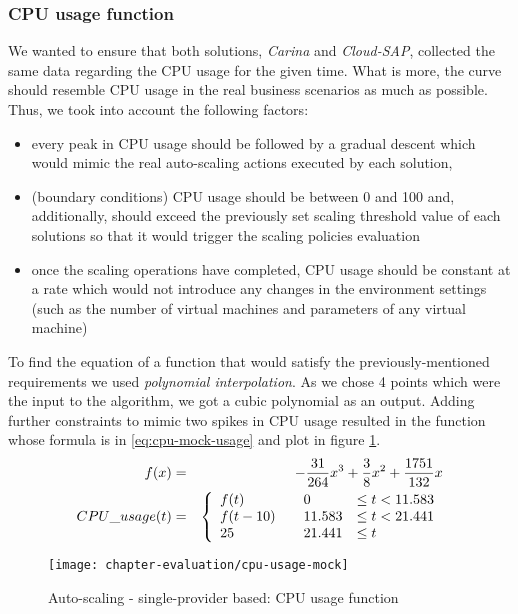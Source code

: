 \subsubsection*{CPU usage function}
We wanted to ensure that both solutions, \emph{Carina} and \emph{Cloud-SAP}, collected the same data regarding the CPU usage for the given time. What is more, the curve should resemble CPU usage in the real business scenarios as much as possible. Thus, we took into account the following factors:
\begin{itemize}
  \item every peak in CPU usage should be followed by a gradual descent which would mimic the real auto-scaling actions executed by each solution,
  \item (boundary conditions) CPU usage should be between 0 and 100 and, additionally, should exceed the previously set scaling threshold value of each solutions so that it would trigger the scaling policies evaluation
  \item once the scaling operations have completed, CPU usage should be constant at a rate which would not introduce any changes in the environment settings (such as the number of virtual machines and parameters of any virtual machine)
\end{itemize}
To find the equation of a function that would satisfy the previously-mentioned requirements we used \emph{polynomial interpolation}. As we chose 4 points which were the input to the algorithm, we got a cubic polynomial as an output. Adding further constraints to mimic two spikes in CPU usage resulted in the function whose formula is in \eqref{eq:cpu-mock-usage} and plot in figure \ref{fig:auto-scaling-1cp-cpu-usage-function}.
\begin{eqnarray}
  f(x) &=& -\frac{31}{264}x^3+\frac{3}{8}x^2+\frac{1751}{132}x \nonumber \\
  CPU\_usage(t) &=& \left\{
  \begin{array}{l l l}
    f(t) & \quad 0 & \le t < 11.583 \\
    f(t-10) & \quad 11.583 & \le t < 21.441 \\
    25 & \quad 21.441 & \le  t \\
\end{array} \right.
\label{eq:cpu-mock-usage}
\end{eqnarray}

\begin{figure}[!ht]
  \begin{center}
    \texttt{[image: chapter-evaluation/cpu-usage-mock]}
  \end{center}
  \caption{Auto-scaling - single-provider based: CPU usage function}
  \label{fig:auto-scaling-1cp-cpu-usage-function}
\end{figure}


